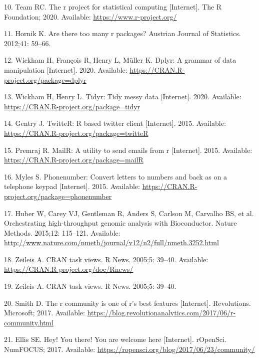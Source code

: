 \documentclass[10pt,letterpaper]{article}
\begin{document}
\leavevmode\hypertarget{ref-Rproject2020}{}%
10. Team RC. The r project for statistical computing {[}Internet{]}. The
R Foundation; 2020. Available: \url{https://www.r-project.org/}

\leavevmode\hypertarget{ref-hornik2012}{}%
11. Hornik K. Are there too many r packages? Austrian Journal of
Statistics. 2012;41: 59--66.

\leavevmode\hypertarget{ref-dplyr}{}%
12. Wickham H, François R, Henry L, Müller K. Dplyr: A grammar of data
manipulation {[}Internet{]}. 2020. Available:
\url{https://CRAN.R-project.org/package=dplyr}

\leavevmode\hypertarget{ref-tidyr}{}%
13. Wickham H, Henry L. Tidyr: Tidy messy data {[}Internet{]}. 2020.
Available: \url{https://CRAN.R-project.org/package=tidyr}

\leavevmode\hypertarget{ref-twitteR}{}%
14. Gentry J. TwitteR: R based twitter client {[}Internet{]}. 2015.
Available: \url{https://CRAN.R-project.org/package=twitteR}

\leavevmode\hypertarget{ref-mailR}{}%
15. Premraj R. MailR: A utility to send emails from r {[}Internet{]}.
2015. Available: \url{https://CRAN.R-project.org/package=mailR}

\leavevmode\hypertarget{ref-phonenumber}{}%
16. Myles S. Phonenumber: Convert letters to numbers and back as on a
telephone keypad {[}Internet{]}. 2015. Available:
\url{https://CRAN.R-project.org/package=phonenumber}

\leavevmode\hypertarget{ref-bioCproject}{}%
17. Huber W, Carey VJ, Gentleman R, Anders S, Carlson M, Carvalho BS, et
al. Orchestrating high-throughput genomic analysis with Bioconductor.
Nature Methods. 2015;12: 115--121. Available:
\url{http://www.nature.com/nmeth/journal/v12/n2/full/nmeth.3252.html}

\leavevmode\hypertarget{ref-ctv}{}%
18. Zeileis A. CRAN task views. R News. 2005;5: 39--40. Available:
\url{https://CRAN.R-project.org/doc/Rnews/}

\leavevmode\hypertarget{ref-zeileis2005}{}%
19. Zeileis A. CRAN task views. R News. 2005;5: 39--40.

\leavevmode\hypertarget{ref-smith2017}{}%
20. Smith D. The r community is one of r's best features {[}Internet{]}.
Revolutions. Microsoft; 2017. Available:
\url{https://blog.revolutionanalytics.com/2017/06/r-community.html}

\leavevmode\hypertarget{ref-ellis2017}{}%
21. Ellis SE. Hey! You there! You are welcome here {[}Internet{]}.
rOpenSci. NumFOCUS; 2017. Available:
\url{https://ropensci.org/blog/2017/06/23/community/}
\end{document}

